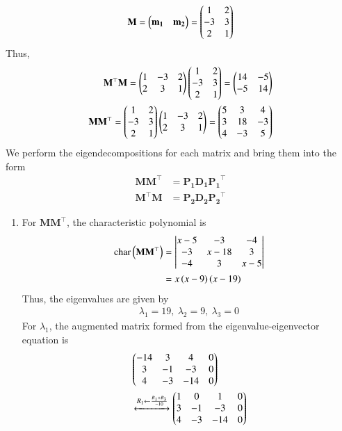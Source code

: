\documentclass[journal,12pt,twocolumn]{IEEEtran}
\renewcommand{\vec}[1]{\boldsymbol{\mathbf{#1}}}
\begin{document}
\begin{enumerate}
\begin{align}
        \vec{M} = \myvec{\vec{m_1} & \vec{m_2}} = \myvec{1&2\\-3&3\\2&1} 
    \end{align}
    Thus,
    \begin{align}
        \vec{M}^\top\vec{M} = \myvec{1&-3&2\\2&3&1}\myvec{1&2\\-3&3\\2&1} = \myvec{14&-5\\-5&14} \\
        \vec{MM}^\top = \myvec{1&2\\-3&3\\2&1}\myvec{1&-3&2\\2&3&1} = \myvec{5&3&4\\3&18&-3\\4&-3&5}
    \end{align}
    We perform the eigendecompositions for each matrix and bring them into the form
    \begin{align}
        \vec{MM}^\top &= \vec{P_1D_1P_1}^\top \label{eq:decomp-1} \\
        \vec{M}^\top\vec{M} &= \vec{P_2D_2P_2}^\top \label{eq:decomp-2}
    \end{align}
    \begin{enumerate}
        \item For $\vec{MM}^\top$, the characteristic polynomial is
        \begin{align}
            \chr{\vec{MM}^\top} &= \mydet{x-5&-3&-4\\-3&x-18&3\\-4&3&x-5} \\
                                      &= x\brak{x-9}\brak{x-19}
                                      \label{eq:char-2}
        \end{align}
        Thus, the eigenvalues are given by
        \begin{align}
            \lambda_1 = 19,\ \lambda_2 = 9,\ \lambda_3 = 0
        \end{align}
        For $\lambda_1$, the augmented matrix formed from the 
        eigenvalue-eigenvector equation is
        \begin{align}
            &\myvec{-14&3&4&0\\3&-1&-3&0\\4&-3&-14&0} \nonumber \\
            &\xleftrightarrow[]{R_1 \leftarrow \frac{R_1+R_3}{-10}} \myvec{1&0&1&0\\3&-1&-3&0\\4&-3&-14&0} \\

\end{align}
\end{enumerate}
\end{enumerate}
\end{document}
